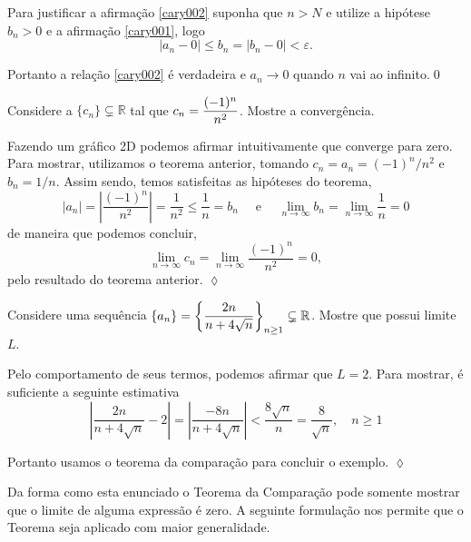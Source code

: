Para justificar a afirma\c{c}\~{a}o \eqref{cary002} suponha que $n>N$ e utilize a hip\'{o}tese  $b_n>0$ e a afirma\c{c}\~{a}o \eqref{cary001}, logo
\begin{equation*}
    |a_n-0|\leq b_n=|b_n-0|<\varepsilon.
\end{equation*}

Portanto a rela\c{c}\~{a}o \eqref{cary002} \'{e} verdadeira e $a_n \to 0$ quando $n$ vai ao infinito.\qed

\begin{exer}
Considere a \seq $\{c_n\}\subsetneq \mathbb{R}$ tal que
$\displaystyle{c_n=\frac{(-1)^n}{n^2}}$. Mostre a converg\^{e}ncia.
\end{exer}

\solo Fazendo um gr\'{a}fico 2D podemos afirmar intuitivamente que converge para zero. Para mostrar, utilizamos o teorema anterior,
tomando $c_n=a_n=(-1)^n/n^2$ e $b_n=1/n$. Assim sendo, temos satisfeitas as hip\'{o}teses do teorema,
\begin{equation*}
|a_n|=\left|\frac{(-1)^n}{n^2}\right|=\frac{1}{n^2}\leq \frac{1}{n}=b_n\quad \text{ e }\quad \lim_{n\to\infty} b_n=\lim_{n\to \infty}\frac{1}{n}=0
\end{equation*}
de maneira que podemos concluir,
\begin{equation*}
 \lim_{n\to \infty} c_n=\lim_{n\to \infty} \frac{(-1)^n}{n^2}=0,
\end{equation*}
pelo resultado do teorema anterior. \hfill \(\lozenge\)

\begin{exer}
Considere uma sequ\^{e}ncia $\{a_n\}=\displaystyle{\left\{\frac{2n}{n+4\sqrt{n}}\right\}_{n\geq 1}\subsetneq \mathbb{R}}$. Mostre que possui limite $L$.
\end{exer}

\solo Pelo comportamento de seus termos, podemos afirmar que $L=2$. Para mostrar, \'{e} suficiente a seguinte estimativa
\begin{equation*}
    \left|\frac{2n}{n+4\sqrt{n}}-2\right|=\left| \frac{-8n}{n+4\sqrt{n}}\right|<\frac{8\sqrt{n}}{n}=\frac{8}{\sqrt{n}},\quad n\geq 1
\end{equation*}

 Portanto usamos o teorema da compara\c{c}\~{a}o para concluir o exemplo. \hfill \(\lozenge\)

Da forma como esta enunciado o Teorema da Compara\c{c}\~{a}o pode somente
mostrar que o limite de alguma express\~{a}o \'{e} zero. A seguinte
formula\c{c}\~{a}o nos permite que o Teorema seja aplicado com maior
generalidade.

